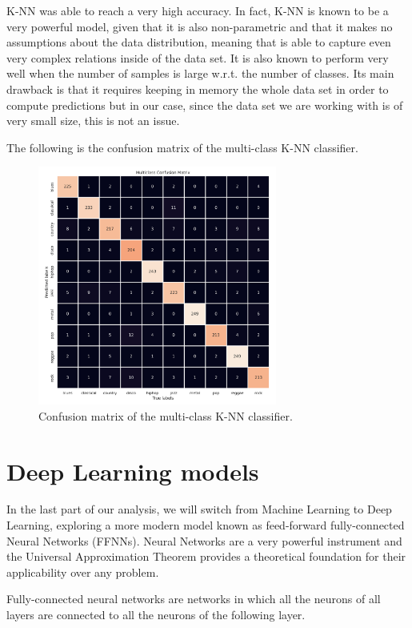\documentclass{Configuration_Files/PoliMi3i_thesis}
\begin{document}
K-NN was able to reach a very high accuracy. In fact, K-NN is known to be a very powerful model, given that it is also non-parametric and that it makes no assumptions about the data distribution, meaning that is able to capture even very complex relations inside of the data set. It is also known to perform very well when the number of samples is large w.r.t. the number of classes. Its main drawback is that it requires keeping in memory the whole data set in order to compute predictions but in our case, since the data set we are working with is of very small size, this is not an issue.

The following is the confusion matrix of the multi-class K-NN classifier.
\begin{figure}[H]
    \centering
    \includegraphics[width=0.7\textwidth]{Figures/knn_m.png}
    \caption{Confusion matrix of the multi-class K-NN classifier.}
    \label{fig:knnm}
\end{figure}


\chapter{Deep Learning models}
\label{ch:dl_models}%
In the last part of our analysis, we will switch from Machine Learning to Deep Learning, exploring a more modern model known as feed-forward fully-connected Neural Networks (FFNNs). Neural Networks are a very powerful instrument and the Universal Approximation Theorem provides a theoretical foundation for their applicability over any problem. 

Fully-connected neural networks are networks in which all the neurons of all layers are connected to all the neurons of the following layer.
\end{document}
